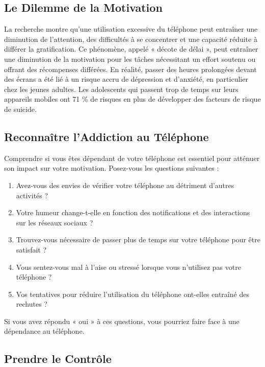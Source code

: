 \documentclass[a4paper, 10pt, final, garamond]{book}
\begin{document}
\subsection{Le Dilemme de la Motivation}

La recherche montre qu'une utilisation excessive du téléphone peut entraîner une
diminution de l'attention, des difficultés à se concentrer et une capacité
réduite à différer la gratification. Ce phénomène, appelé « décote de délai »,
peut entraîner une diminution de la motivation pour les tâches nécessitant un
effort soutenu ou offrant des récompenses différées. En réalité, passer des
heures prolongées devant des écrans a été lié à un risque accru de dépression et
d'anxiété, en particulier chez les jeunes adultes. Les adolescents qui passent
trop de temps sur leurs appareils mobiles ont 71 \% de risques en plus de
développer des facteurs de risque de suicide.

\subsection{Reconnaître l'Addiction au Téléphone}

Comprendre si vous êtes dépendant de votre téléphone est essentiel pour atténuer
son impact sur votre motivation. Posez-vous les questions suivantes :
\begin{enumerate}
	\item Avez-vous des envies de vérifier votre téléphone au détriment d'autres
	      activités ?
	\item Votre humeur change-t-elle en fonction des notifications et des
	      interactions sur les réseaux sociaux ?
	\item Trouvez-vous nécessaire de passer plus de temps sur votre téléphone pour
	      être satisfait ?
	\item Vous sentez-vous mal à l'aise ou stressé lorsque vous n'utilisez pas
	      votre téléphone ?
	\item Vos tentatives pour réduire l'utilisation du téléphone ont-elles
	      entraîné des rechutes ?
\end{enumerate}

Si vous avez répondu « oui » à ces questions, vous pourriez faire face à une
dépendance au téléphone.

\subsection{Prendre le Contrôle}
\end{document}
